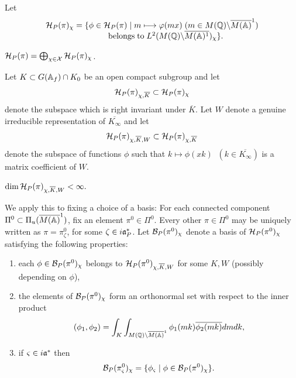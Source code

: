 Let
\[
\begin{array}{c}
{\cal H}_P(\pi )_\chi
=\{\phi \in {\cal H}_P(\pi )\;|\;m\longmapsto \varphi (mx)
\;(m\in M({\Bbb{Q}})\backslash \overline{M({\Bbb{A}})}^1) \\
{\rm \;\;\;\;\;\;\;\;\;\;\;\;belongs\;to}
\;L^2(M({\Bbb{Q}})\backslash \overline{M({\Bbb{A}})^1})_\chi \}.
\end{array}
\]

\begin{proposition}
${\cal H}_P(\pi )=\bigoplus_{\chi \in {\cal X}}{\cal H}_P(\pi )_\chi $.
\end{proposition}

Let $K\subset G({\Bbb{A}}_f)\cap K_0$ be an open compact subgroup and let 
\begin{equation}
{\cal H}_P(\pi )_{\chi ,\overline{K}}\subset {\cal H}_P(\pi )_\chi 
\end{equation}
denote the subspace which is right invariant under
$\overline{K}$. Let $W$ denote a genuine
irreducible representation of $\overline{K_\infty} $ and let 
\begin{equation}
{\cal H}_P(\pi )_{\chi ,\overline{K},W}
\subset {\cal H}_P(\pi )_{\chi ,\overline{K}}
\end{equation}
denote the subspace of functions $\phi $ such that
$k\longmapsto \phi (xk)\;\;(k\in \overline{K_\infty} )$
is a matrix coefficient of $W$.

\begin{proposition}
$\dim {\cal H}_P(\pi )_{\chi ,\overline{K},W}<\infty .$
\end{proposition}

We apply this to fixing a choice of a basis:
For each connected component $\Pi^0\subset
\Pi_u(\overline{M({\Bbb{A}})}^1)$, fix an element $\pi^0\in \Pi^0$.
Every other $\pi\in\Pi^0$ may be uniquely written as
$\pi=\pi^0_\zeta$, for some $\zeta\in i{\frak{a}}^*_P$.
Let ${\cal B}_P(\pi^0 )_\chi $
denote a basis of ${\cal H}_P(\pi^0 )_\chi $ satisfying the following
properties:

\begin{enumerate}
\item  each $\phi \in {\cal B}_P(\pi^0 )_\chi $ belongs to
${\cal H}_P(\pi^0)_{\chi ,\overline{K},W}$
for some $K,W$ (possibly depending on $\phi $),

\item  the elements of ${\cal B}_P(\pi^0 )_\chi $
form an orthonormal set with
respect to the inner product
\[
(\phi _1,\phi _2)=
\int_K\int_{M({\Bbb{Q}})\backslash \overline{M({\Bbb{A}})}^1}
\phi _1(mk)\overline{\phi _2(mk)}dmdk,
\]

\item  if $\varsigma \in i{\frak{a}}^{*}$ then 
\[
{\cal B}_P(\pi^0_\varsigma )_\chi =\{\phi _\varsigma \;|\;
\phi \in {\cal B}_P(\pi^0 )_\chi \}.
\]
\end{enumerate}

